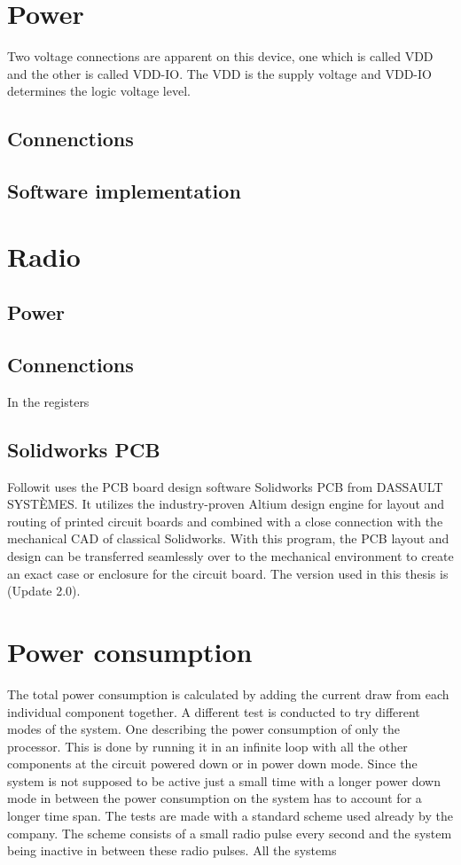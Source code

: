 \section{Power}
Two voltage connections are apparent on this device, one which is called VDD and the other is called VDD-IO. The VDD is the supply voltage and VDD-IO determines the logic voltage level. 

\subsection{Connenctions}


\subsection{Software implementation}



\newpage
\section{Radio}


\subsection{Power}


\subsection{Connenctions}
 In the registers 


\subsection{Solidworks PCB}
Followit uses the PCB board design software Solidworks PCB from DASSAULT SYSTÈMES. It utilizes the industry-proven Altium design engine for layout and routing of printed circuit boards and combined with a close connection with the mechanical CAD of classical Solidworks. With this program, the PCB layout and design can be transferred seamlessly over to the mechanical environment to create an exact case or enclosure for the circuit board. The version used in this thesis is (Update 2.0).


\section{Power consumption}
 The total power consumption is calculated by adding the current draw from each individual component together.  A different test is conducted to try different modes of the system. One describing the power consumption of only the processor. This is done by running it in an infinite loop with all the other components at the circuit powered down or in power down mode. Since the system is not supposed to be active just a small time with a longer power down mode in between the power consumption on the system has to account for a longer time span. The tests are made with a standard scheme used already by the company. The scheme consists of a small radio pulse every second and the system being inactive in between these radio pulses. 
All the systems 
